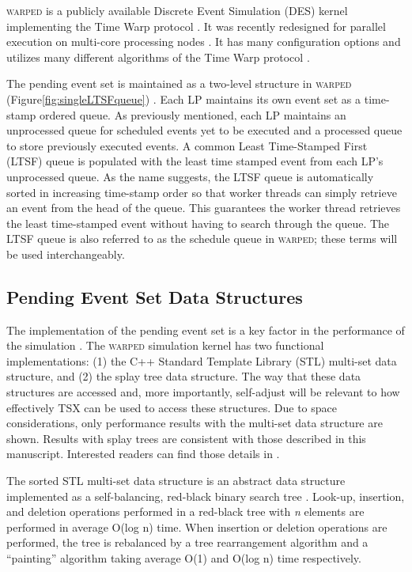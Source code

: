 \documentclass{sig-alternate}
\begin{document}
\textsc{warped} is a publicly available Discrete Event Simulation (DES) kernel
implementing the Time Warp protocol \cite{martin,fujimoto}.  It was recently redesigned
for parallel execution on multi-core processing nodes \cite{muthalagu}.  It has many
configuration options and utilizes many different algorithms of the Time Warp protocol
\cite{fujimoto}.

The pending event set is maintained as a two-level structure in \textsc{warped}
(Figure\ref{fig:singleLTSFqueue}) \cite{dickman}.  Each LP maintains its own event set as
a time-stamp ordered queue.  As previously mentioned, each LP maintains an unprocessed
queue for scheduled events yet to be executed and a processed queue to store previously
executed events.  A common Least Time-Stamped First (LTSF) queue is populated with the
least time stamped event from each LP's unprocessed queue.  As the name suggests, the LTSF
queue is automatically sorted in increasing time-stamp order so that worker threads can
simply retrieve an event from the head of the queue.  This guarantees the worker thread
retrieves the least time-stamped event without having to search through the queue. The
LTSF queue is also referred to as the schedule queue in \textsc{warped}; these terms will
be used interchangeably.

\subsection{Pending Event Set Data Structures}


The implementation of the pending event set is a key factor in the performance of the
simulation \cite{twpes}.  The \textsc{warped} simulation kernel has two functional
implementations: (1) the C++ Standard Template Library (STL) multi-set data structure, and
(2) the splay tree data structure.  The way that these data structures are accessed and,
more importantly, self-adjust will be relevant to how effectively TSX can be used to
access these structures.  Due to space considerations, only performance results with the
multi-set data structure are shown.  Results with splay trees are consistent with those
described in this manuscript.  Interested readers can find those details in \cite{hay-14}.

The sorted STL multi-set data structure is an abstract data structure implemented as a
self-balancing, red-black binary search tree \cite{redblack}.  Look-up, insertion, and
deletion operations performed in a red-black tree with \emph{n} elements are performed in
average O(log n) time.  When insertion or deletion operations are performed, the tree is
rebalanced by a tree rearrangement algorithm and a ``painting'' algorithm taking average
O(1) and O(log n) time respectively.
\end{document}
